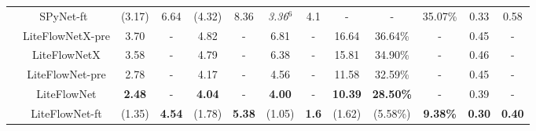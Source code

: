 \documentclass[10pt,twocolumn,letterpaper]{article}
\begin{document}
\begin{table}[t]
{\begin{tabular}{|c|c||c c|c c|c c|c c c|c c|}
\multirow{1}{*}{}
&\multirow{1}{*}{SPyNet-ft~\cite{Ranjan17}}				
&(3.17)&\multicolumn{1}{c|}{6.64}	           
&(4.32)&\multicolumn{1}{c||}{8.36}
&\textit{3.36}$^{6}$&\multicolumn{1}{c|}{4.1}	
&-&\multicolumn{1}{c}{-}&\multicolumn{1}{c||}{35.07\%}	
&0.33&\multicolumn{1}{c|}{0.58} \\  

\multirow{1}{*}{}
&\multirow{1}{*}{LiteFlowNetX-pre}				
&3.70&\multicolumn{1}{c|}{-}	           
&4.82&\multicolumn{1}{c||}{-}
&6.81&\multicolumn{1}{c|}{-}		
&16.64&\multicolumn{1}{c}{36.64\%}&\multicolumn{1}{c||}{-}		
&0.45&\multicolumn{1}{c|}{-} \\                                                       

\multirow{1}{*}{}
&\multirow{1}{*}{LiteFlowNetX}				
&3.58&\multicolumn{1}{c|}{-}	           
&4.79&\multicolumn{1}{c||}{-}
&6.38&\multicolumn{1}{c|}{-}		
&15.81&\multicolumn{1}{c}{34.90\%}&\multicolumn{1}{c||}{-}		
&0.46&\multicolumn{1}{c|}{-} \\                                                                                                                                                                                                                                                
                                                                
\multirow{1}{*}{}                                                                    
&\multirow{1}{*}{LiteFlowNet-pre}				
&2.78&\multicolumn{1}{c|}{-}	           
&4.17&\multicolumn{1}{c||}{-}
&4.56&\multicolumn{1}{c|}{-}		
&11.58&\multicolumn{1}{c}{32.59\%}&\multicolumn{1}{c||}{-}		
&0.45&\multicolumn{1}{c|}{-} \\                                                                                       

\multirow{1}{*}{}
&\multirow{1}{*}{LiteFlowNet}				
&\textbf{2.48}&\multicolumn{1}{c|}{-}	           
&\textbf{4.04}&\multicolumn{1}{c||}{-}
&\textbf{4.00}&\multicolumn{1}{c|}{-}		
&\textbf{10.39}&\multicolumn{1}{c}{\textbf{28.50\%}}&\multicolumn{1}{c||}{-}		
&0.39&\multicolumn{1}{c|}{-} \\                                                                                      

\multirow{1}{*}{}
&\multirow{1}{*}{LiteFlowNet-ft}				
&(1.35)&\multicolumn{1}{c|}{\textbf{4.54}}           
&(1.78)&\multicolumn{1}{c||}{\textbf{5.38}}
&(1.05)&\multicolumn{1}{c|}{\textbf{1.6}}		
&(1.62)&\multicolumn{1}{c}{(5.58\%)}&\multicolumn{1}{c||}{\textbf{9.38\%}}		
&\textbf{0.30}&\multicolumn{1}{c|}{\textbf{0.40}} \\    
\hline
\end{tabular}}
\end{table}
\end{document}
